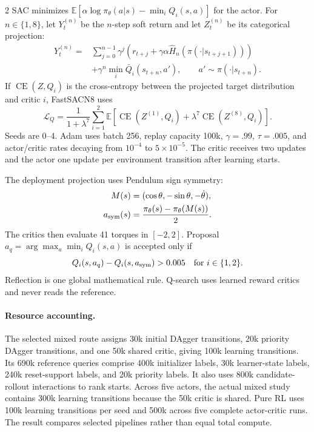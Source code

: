 \begin{multicols}{2}
SAC minimizes $\mathbb E[\alpha\log\pi_\theta(a|s)-\min_iQ_i(s,a)]$ for the actor. For $n\in\{1,8\}$, let $Y_t^{(n)}$ be the $n$-step soft return and let $Z_t^{(n)}$ be its categorical projection:
\[
\begin{aligned}
Y_t^{(n)}={}&\sum_{j=0}^{n-1}\gamma^j
\left(r_{t+j}+\gamma\alpha\widehat H_n(\pi(\cdot|s_{t+j+1}))\right)\\
&+\gamma^n\min_i\bar Q_i(s_{t+n},a'),\qquad a'\sim\pi(\cdot|s_{t+n}).
\end{aligned}
\]
If $\operatorname{CE}(Z,Q_i)$ is the cross-entropy between the projected target distribution and critic $i$, FastSACN8 uses
\[
\mathcal L_Q=
\frac{1}{1+\lambda^7}
\sum_{i=1}^{2}\mathbb E\!\left[
\operatorname{CE}\!\left(Z^{(1)},Q_i\right)+
\lambda^7\operatorname{CE}\!\left(Z^{(8)},Q_i\right)
\right].
\]
Seeds are 0--4. Adam uses batch 256, replay capacity 100k, $\gamma=.99$, $\tau=.005$, and actor/critic rates decaying from $10^{-4}$ to $5{\times}10^{-5}$. The critic receives two updates and the actor one update per environment transition after learning starts.

The deployment projection uses Pendulum sign symmetry:
\[
\begin{aligned}
M(s)&=(\cos\theta,-\sin\theta,-\dot\theta),\\
a_{\rm sym}(s)&=\frac{\pi_\theta(s)-\pi_\theta(M(s))}{2}.
\end{aligned}
\]
The critics then evaluate 41 torques in $[-2,2]$. Proposal
$a_q=\arg\max_a\min_iQ_i(s,a)$ is accepted only if
\[
Q_i(s,a_q)-Q_i(s,a_{\rm sym})>0.005
\quad\text{for }i\in\{1,2\}.
\]
Reflection is one global mathematical rule. Q-search uses learned reward critics and never reads the reference.

\paragraph{Resource accounting.}
The selected mixed route assigns 30k initial DAgger transitions, 20k priority DAgger transitions, and one 50k shared critic, giving 100k learning transitions. Its 690k reference queries comprise 400k initializer labels, 30k learner-state labels, 240k reset-support labels, and 20k priority labels. It also uses 800k candidate-rollout interactions to rank starts. Across five actors, the actual mixed study contains 300k learning transitions because the 50k critic is shared. Pure RL uses 100k learning transitions per seed and 500k across five complete actor-critic runs. The result compares selected pipelines rather than equal total compute.


\end{multicols}
